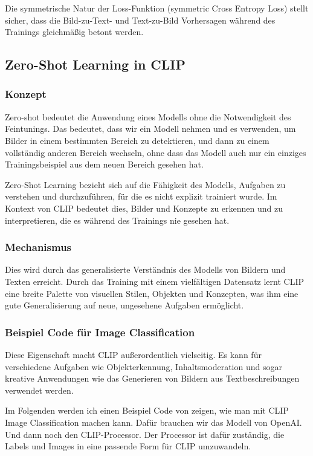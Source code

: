 \documentclass[nolibertine, ngerman, algorithm, nomencl, minted]{ttlab-qualify}
\begin{document}
Die symmetrische Natur der Loss-Funktion (symmetric Cross Entropy Loss) stellt sicher, 
dass die Bild-zu-Text- und Text-zu-Bild Vorhersagen während des Trainings gleichmäßig betont werden.

\subsection{Zero-Shot Learning in CLIP}
\subsubsection{Konzept}
Zero-shot bedeutet die Anwendung eines Modells ohne die Notwendigkeit des Feintunings. 
Das bedeutet, dass wir ein Modell nehmen und es verwenden, um Bilder in einem 
bestimmten Bereich zu detektieren, und dann zu einem vollständig anderen Bereich wechseln, 
ohne dass das Modell auch nur ein einziges Trainingsbeispiel aus dem neuen Bereich gesehen hat.

Zero-Shot Learning bezieht sich auf die Fähigkeit des Modells,
Aufgaben zu verstehen und durchzuführen, für die es nicht 
explizit trainiert wurde. Im Kontext von CLIP bedeutet dies, 
Bilder und Konzepte zu erkennen und zu interpretieren, 
die es während des Trainings nie gesehen hat.

\subsubsection{Mechanismus}
Dies wird durch das generalisierte Verständnis des Modells von Bildern und Texten 
erreicht. Durch das Training mit einem vielfältigen Datensatz lernt CLIP eine breite 
Palette von visuellen Stilen, Objekten und Konzepten, was ihm eine gute Generalisierung 
auf neue, ungesehene Aufgaben ermöglicht.

\subsubsection{Beispiel Code für Image Classification}
Diese Eigenschaft macht CLIP außerordentlich vielseitig. Es kann für verschiedene 
Aufgaben wie Objekterkennung, Inhaltsmoderation und sogar kreative Anwendungen wie 
das Generieren von Bildern aus Textbeschreibungen verwendet werden.

Im Folgenden werden ich einen Beispiel Code von \textcite{pinecone2023zeroshot} zeigen, wie man mit CLIP Image Classification machen kann.
Dafür brauchen wir das Modell von OpenAI. Und dann noch den CLIP-Processor.
Der Processor ist dafür zuständig, die Labels und Images in eine passende Form für CLIP umzuwandeln.
\end{document}
